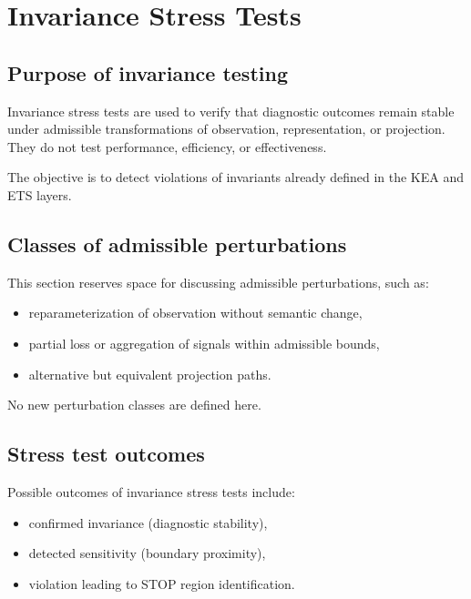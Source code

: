 
\section{Invariance Stress Tests}
\label{sec:invariance-stress-tests}

\subsection{Purpose of invariance testing}
Invariance stress tests are used to verify that diagnostic outcomes remain stable
under admissible transformations of observation, representation, or projection.
They do not test performance, efficiency, or effectiveness.

The objective is to detect violations of invariants already defined in the KEA and
ETS layers.

\subsection{Classes of admissible perturbations}
This section reserves space for discussing admissible perturbations, such as:
\begin{itemize}
  \item reparameterization of observation without semantic change,
  \item partial loss or aggregation of signals within admissible bounds,
  \item alternative but equivalent projection paths.
\end{itemize}

No new perturbation classes are defined here.

\subsection{Stress test outcomes}
Possible outcomes of invariance stress tests include:
\begin{itemize}
  \item confirmed invariance (diagnostic stability),
  \item detected sensitivity (boundary proximity),
  \item violation leading to STOP region identification.
\end{itemize}

